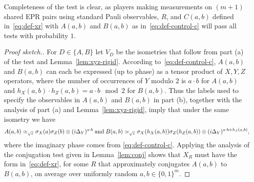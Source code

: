  Completeness of the test is clear, as players making measurements on $(m+1)$ shared EPR pairs using standard Pauli observables, $R$, and $C(a,b)$ defined in~\eqref{eq:def-xr} with $A(a,b)$ and $B(a,b)$ as in~\eqref{eq:def-control-c} will pass all tests with probability $1$.  %

\begin{proof}[Proof sketch.]
For $D\in\{A,B\}$ let $V_D$ be the isometries that follow from part (a) of the test and Lemma~\ref{lem:xyz-rigid}.
According to~\eqref{eq:def-control-c}, $A(a,b)$ and $B(a,b)$ can each be expressed (up to phase) as a tensor product of $X,Y,Z$ operators, where the number of occurrences of $Y$ modulo $2$ is $a\cdot b$ for $A(a,b)$ and  $h_X(a,b)\cdot h_Z(a,b) = a\cdot b\mod 2$ for $B(a,b)$. Thus the labels used to specify the observables in $A(a,b)$ and $B(a,b)$ in part (b), together with the analysis of part (a) and Lemma~\ref{lem:xyz-rigid}, imply that under the same isometry we  have
$$A(a,b) \simeq_{\sqrt{\varepsilon}} \sigma_X(a)\sigma_Z(b) \otimes (i\Delta_Y)^{a\cdot b}
\;\text{and}\;
 B(a,b) \simeq_{\sqrt{\varepsilon}} \sigma_X(h_X(a,b)) \sigma_Z(h_Z(a,b)) \otimes (i\Delta_Y)^{a\cdot b + h_S(a,b)},$$
where the imaginary phase comes from \eqref{eq:def-control-c}. 
Applying the analysis of the conjugation test given in Lemma~\ref{lem:conj} shows that $X_R$ must have the form in~\eqref{eq:def-xr}, for some $R$ that approximately conjugates $A(a,b)$ to $B(a,b)$, on average over uniformly random $a,b\in\{0,1\}^m$.


\end{proof}
